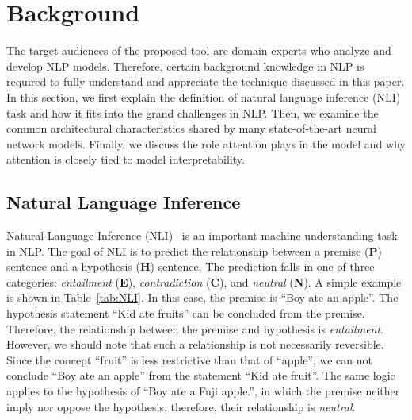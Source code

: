 \section{Background}
The target audiences of the proposed tool are domain experts who analyze and develop NLP models. Therefore, certain background knowledge in NLP is required to fully understand and appreciate the technique discussed in this paper. In this section, we first explain the definition of natural language inference (NLI) task and how it fits into the grand challenges in NLP. Then, we examine the common architectural characteristics shared by many state-of-the-art neural network models. Finally, we discuss the role attention plays in the model and why attention is closely tied to model interpretability.

\subsection{Natural Language Inference}
\label{sec:languageInference}
Natural Language Inference (NLI)~\cite{DaganRothSammons2013} is an important machine understanding task in NLP.
The goal of NLI is to predict the relationship between a premise (\textbf{P}) sentence and a hypothesis (\textbf{H}) sentence.
The prediction falls in one of three categories: \emph{entailment} (\textbf{E}), \emph{contradiction} (\textbf{C}), and \emph{neutral} (\textbf{N}).
A simple example is shown in Table~\ref{tab:NLI}.
In this case, the premise is ``Boy ate an apple''.
The hypothesis statement ``Kid ate fruits'' can be concluded from the premise. Therefore, the relationship between the premise and hypothesis is \emph{entailment}. However, we should note that such a relationship is not necessarily reversible. Since the concept ``fruit'' is less restrictive than that of ``apple'', we can not conclude ``Boy ate an apple'' from the statement ``Kid ate fruit''. The same logic applies to the hypothesis of ``Boy ate a Fuji apple.'', in which the premise neither imply nor oppose the hypothesis, therefore, their relationship is \emph{neutral}.

